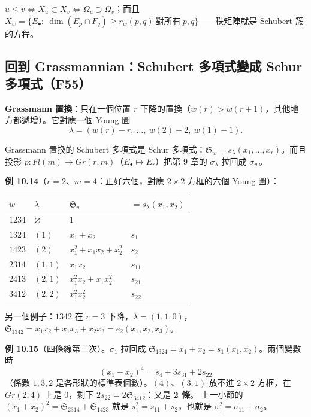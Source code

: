 \begin{thmbox}[命題 7 \fulref{p.175--176}]
$u\le v\iff X_u\subset X_v\iff\Omega_u\supset\Omega_v$；而且 $X_w=\{E_\bullet:\ \dim(E_p\cap F_q)\ge r_w(p,q)\ \text{對所有}\ p,q\}$——秩矩陣就是 Schubert 簇的方程。
\end{thmbox}

\subsection{回到 Grassmannian：Schubert 多項式變成 Schur 多項式（F55）}\label{sec:f-schurweyl-gr}

\textbf{Grassmann 置換}：只在一個位置 $r$ 下降的置換（$w(r)>w(r+1)$，其他地方都遞增）。它對應一個 Young 圖
\[
\lambda=(w(r)-r,\ \dots,\ w(2)-2,\ w(1)-1).
\]
\begin{thmbox}[命題 8、9 \fulref{p.178--179}]
Grassmann 置換的 Schubert 多項式是 Schur 多項式：$\mathfrak S_w=s_\lambda(x_1,\dots,x_r)$。而且投影 $p:Fl(m)\to Gr(r,m)$（$E_\bullet\mapsto E_r$）把第 9 章的 $\sigma_\lambda$ 拉回成 $\sigma_w$。
\end{thmbox}

\textbf{例 10.14}（$r=2$、$m=4$：正好六個，對應 $2\times2$ 方框的六個 Young 圖）：
\begin{center}
\begin{tabular}{@{}llll@{}}
\toprule
$w$ & $\lambda$ & $\mathfrak S_w$ & $=s_\lambda(x_1,x_2)$\\
\midrule
$1234$ & $\varnothing$ & $1$ & \\
$1324$ & $(1)$ & $x_1+x_2$ & $s_1$\\
$1423$ & $(2)$ & $x_1^2+x_1x_2+x_2^2$ & $s_2$\\
$2314$ & $(1,1)$ & $x_1x_2$ & $s_{11}$\\
$2413$ & $(2,1)$ & $x_1^2x_2+x_1x_2^2$ & $s_{21}$\\
$3412$ & $(2,2)$ & $x_1^2x_2^2$ & $s_{22}$\\
\bottomrule
\end{tabular}
\end{center}
另一個例子：$1342$ 在 $r=3$ 下降，$\lambda=(1,1,0)$，$\mathfrak S_{1342}=x_1x_2+x_1x_3+x_2x_3=e_2(x_1,x_2,x_3)$。

\textbf{例 10.15}（四條線第三次）。$\sigma_1$ 拉回成 $\mathfrak S_{1324}=x_1+x_2=s_1(x_1,x_2)$。兩個變數時
\[
(x_1+x_2)^4=s_4+3s_{31}+2s_{22}
\]
（係數 $1,3,2$ 是各形狀的標準表個數）。$(4)$、$(3,1)$ 放不進 $2\times2$ 方框，在 $Gr(2,4)$ 上是 0，剩下 $2s_{22}=2\mathfrak S_{3412}$：又是 \textbf{2 條}。
上一小節的 $(x_1+x_2)^2=\mathfrak S_{2314}+\mathfrak S_{1423}$ 就是 $s_1^2=s_{11}+s_2$，也就是 $\sigma_1^2=\sigma_{11}+\sigma_2$。

